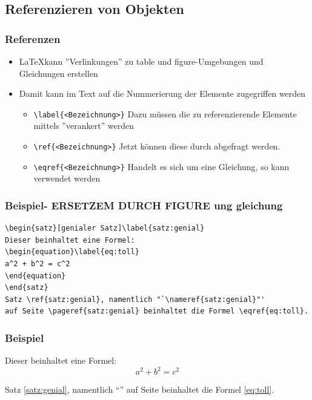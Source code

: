 \subsection{Referenzieren von Objekten}

\begin{frame}[fragile]
\frametitle{Referenzen}
\begin{itemize}[<+->]
  \item \LaTeX kann ''Verlinkungen'' zu table und figure-Umgebungen und Gleichungen erstellen
  \item Damit kann im Text auf die Nummerierung der Elemente zugegriffen werden
    \begin{itemize}[<+->]
      \item \lstinline[style=Latex]+\label{<Bezeichnung>}+ Dazu müssen die zu referenzierende Elemente mittels  ''verankert'' werden
      \item \lstinline[style=Latex]+\ref{<Bezeichnung>}+ Jetzt können diese durch abgefragt werden. 
      \item \lstinline[style=Latex]+\eqref{<Bezeichnung>}+ Handelt es sich um eine Gleichung, so kann  verwendet werden
    \end{itemize}
  \end{itemize}
\end{frame}


\begin{frame}[fragile]
\frametitle{Beispiel- ERSETZEM DURCH FIGURE ung gleichung}
\begin{lstlisting}[style=Latex]
\begin{satz}[genialer Satz]\label{satz:genial}
Dieser beinhaltet eine Formel:
\begin{equation}\label{eq:toll}
a^2 + b^2 = c^2
\end{equation}
\end{satz}
Satz \ref{satz:genial}, namentlich "`\nameref{satz:genial}"' 
auf Seite \pageref{satz:genial} beinhaltet die Formel \eqref{eq:toll}.
\end{lstlisting}
\pause
\end{frame}

\begin{frame}[fragile]
\frametitle{Beispiel}
\begin{satz}\label{satz:genial}
Dieser beinhaltet eine Formel:
\begin{equation}\label{eq:toll}
a^2 + b^2 = c^2
\end{equation}
\end{satz}
Satz \ref{satz:genial}, namentlich "`"' 
auf Seite \pageref{satz:genial} beinhaltet die Formel \eqref{eq:toll}.
\end{frame}


